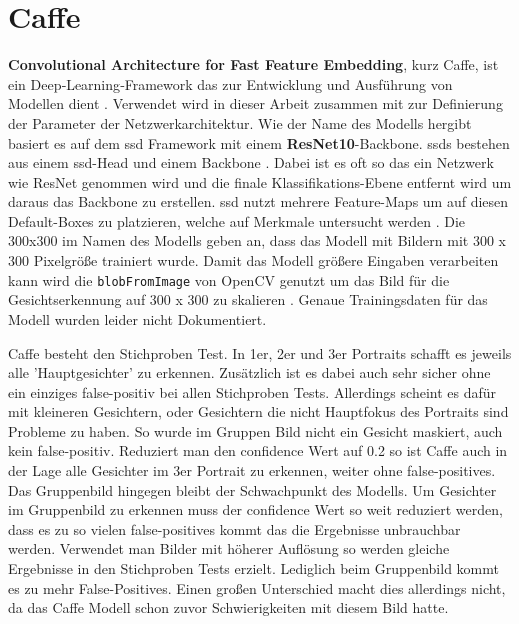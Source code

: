 \section{Caffe}
\textbf{Convolutional Architecture for Fast Feature Embedding}, kurz Caffe, ist ein Deep‑Learning‑Framework das zur Entwicklung und Ausführung von Modellen dient \parencite{JiaSDKLGGD14}. Verwendet wird in dieser Arbeit  zusammen mit  zur Definierung der Parameter der Netzwerkarchitektur. Wie der Name des Modells hergibt basiert es auf dem \gls{ssd} Framework mit einem \textbf{ResNet10}-Backbone. \gls{ssd}s bestehen aus einem \gls{ssd}-Head und einem Backbone \parencite{Esri2025SSD}. Dabei ist es oft so das ein Netzwerk wie ResNet genommen wird und die finale Klassifikations-Ebene entfernt wird um daraus das Backbone zu erstellen. \gls{ssd} nutzt mehrere Feature-Maps um auf diesen Default-Boxes zu platzieren, welche auf Merkmale untersucht werden \parencite{Liu2016}. Die 300x300 im Namen des Modells geben an, dass das Modell mit Bildern mit 300 x 300 Pixelgröße trainiert wurde. Damit das Modell größere Eingaben verarbeiten kann wird die \texttt{blobFromImage} von OpenCV genutzt um das Bild für die Gesichtserkennung auf 300 x 300 zu skalieren \parencite{sefiks14451}. Genaue Trainingsdaten für das Modell wurden leider nicht Dokumentiert.

Caffe besteht den Stichproben Test. In 1er, 2er und 3er Portraits schafft es jeweils alle 'Hauptgesichter' zu erkennen. Zusätzlich ist es dabei auch sehr sicher ohne ein einziges false-positiv bei allen Stichproben Tests. Allerdings scheint es dafür mit kleineren Gesichtern, oder Gesichtern die nicht Hauptfokus des Portraits sind Probleme zu haben. So wurde im Gruppen Bild nicht ein Gesicht maskiert, auch kein false-positiv. Reduziert man den confidence Wert auf 0.2 so ist Caffe auch in der Lage alle Gesichter im 3er Portrait zu erkennen, weiter ohne false-positives. Das Gruppenbild hingegen bleibt der Schwachpunkt des Modells. Um Gesichter im Gruppenbild zu erkennen muss der confidence Wert so weit reduziert werden, dass es zu so vielen false-positives kommt das die Ergebnisse unbrauchbar werden. Verwendet man Bilder mit höherer Auflösung so werden gleiche Ergebnisse in den Stichproben Tests erzielt. Lediglich beim Gruppenbild kommt es zu mehr False-Positives. Einen großen Unterschied macht dies allerdings nicht, da das Caffe Modell schon zuvor Schwierigkeiten mit diesem Bild hatte.

